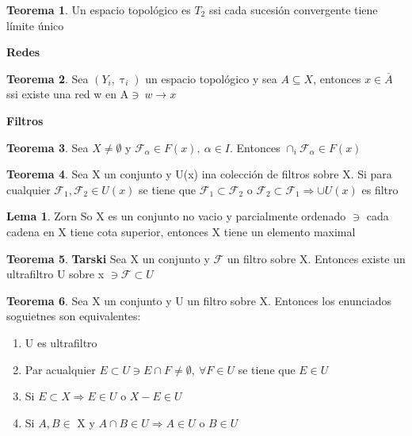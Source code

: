\documentclass{article}
\theoremstyle{definition}
\newtheorem{theorem}{Teorema}[section]
\newtheorem{lemma}{Lema}[section]
\begin{document}

\begin{theorem}
	Un espacio topológico es $T_2$ ssi cada sucesión convergente tiene límite único
\end{theorem}
\textbf{Redes}


\begin{theorem}
	Sea $(Y_i,\uptau_i)$ un espacio topológico y sea $A\subseteq X$, entonces $x\in \overline{A}$ ssi existe una red w en A$\ni\ w\to x$
\end{theorem}
\textbf{Filtros}


\begin{theorem}
	Sea $X\neq\emptyset$ y $\mathcal{F}_{\alpha}\in F(x),\ \alpha\in I$. Entonces $\cap_i\mathcal{F}_{\alpha}\in F(x)$
\end{theorem}


\begin{theorem}
	Sea X un conjunto y U(x) ina colección de filtros sobre X. Si para cualquier $\mathcal{F}_1,\mathcal{F}_2\in U(x)$ se tiene que $\mathcal{F}_1\subset\mathcal{F}_2$ o $\mathcal{F}_2\subset\mathcal{F}_1\Rightarrow \cup U(x)$ es filtro
\end{theorem}


\begin{lemma}{Zorn}
	So X es un conjunto no vacio y parcialmente ordenado $\ni$ cada cadena en X tiene cota superior, entonces X tiene un elemento maximal
\end{lemma}


\begin{theorem}{\textbf{Tarski}}
	Sea X un conjunto y $\mathcal{F}$ un filtro sobre X. Entonces existe un ultrafiltro U sobre x $\ni \mathcal{F}\subset U$
\end{theorem}


\begin{theorem}
	Sea X un conjunto y U un filtro sobre X. Entonces los enunciados soguietnes son equivalentes:
	\begin{enumerate}
		\item U es ultrafiltro
		\item Par acualquier $E\subset U\ni E\cap F\neq \emptyset,\ \forall F\in U$ se tiene que $E\in U$
		\item Si $E\subset X\Rightarrow E\in U$ o $X-E\in U$
		\item Si $A, B\in$ X y $ A\cap B\in U\Rightarrow A\in U$ o $ B\in U$
	\end{enumerate}
\end{theorem}
\end{document}
